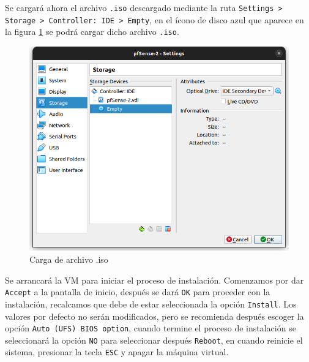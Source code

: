 \documentclass{article}
\begin{document}
            Se cargará ahora el archivo \texttt{.iso} descargado mediante la ruta \texttt{Settings > Storage > Controller: IDE > Empty}, en el ícono de disco azul que aparece en la figura \ref{fig:pfsense-iso-load} se podrá cargar dicho archivo \texttt{.iso}.
            \begin{figure}
                \centering
                \includegraphics[scale=0.3]{img/pfsense-iso-load.png}
                \caption{Carga de archivo .iso}
                \label{fig:pfsense-iso-load}
            \end{figure}

            Se arrancará la VM para iniciar el proceso de instalación. Comenzamos por dar \texttt{Accept} a la pantalla de inicio, después se dará \texttt{OK} para proceder con la instalación, recalcamos que debe de estar seleccionada la opción \texttt{Install}. Los valores por defecto no serán modificados, pero se recomienda después escoger la opción \texttt{Auto (UFS) BIOS option}, cuando termine el proceso de instalación se seleccionará la opción \texttt{NO} para seleccionar después \texttt{Reboot}, en cuando reinicie el sistema, presionar la tecla \texttt{ESC} y apagar la máquina virtual.
\end{document}
